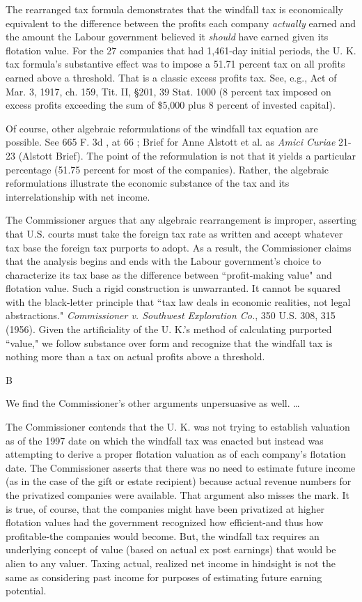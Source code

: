 \begin{select}
The rearranged tax formula demonstrates that the windfall tax is economically equivalent to the difference between the profits each company \emph{actually} earned and the amount the Labour government believed it \emph{should} have earned given its flotation value. For the 27 companies that had 1,461-day initial periods, the U. K. tax formula's substantive effect was to impose a 51.71 percent tax on all profits earned above a threshold. That is a classic excess profits tax. See, e.g., Act of Mar. 3, 1917, ch. 159, Tit. II, §201, 39 Stat. 1000 (8 percent tax imposed on excess profits exceeding the sum of \$5,000 plus 8 percent of invested capital).

Of course, other algebraic reformulations of the windfall tax equation are possible. See 665 F. 3d , at 66 ; Brief for Anne Alstott et al. as \emph{Amici Curiae} 21-23 (Alstott Brief). The point of the reformulation is not that it yields a particular percentage (51.75 percent for most of the companies). Rather, the algebraic reformulations illustrate the economic substance of the tax and its interrelationship with net income. 

The Commissioner argues that any algebraic rearrangement is improper, asserting that U.S. courts must take the foreign tax rate as written and accept whatever tax base the foreign tax purports to adopt.  As a result, the Commissioner claims that the analysis begins and ends with the Labour government's choice to characterize its tax base as the difference between ``profit-making value" and flotation value. Such a rigid construction is unwarranted. It cannot be squared with the black-letter principle that ``tax law deals in economic realities, not legal abstractions." \emph{Commissioner v. Southwest Exploration Co.}, 350 U.S. 308, 315 (1956). Given the artificiality of the  U. K.'s method of calculating purported ``value," we follow substance over form and recognize that the windfall tax is nothing more than a tax on actual profits above a threshold. 

\begin{center}
B
\end{center}

We find the Commissioner's other arguments unpersuasive as well. \ldots 

The Commissioner contends that the U. K. was not trying to establish valuation as of the 1997 date on which the windfall tax was enacted but instead was attempting to derive a proper flotation valuation as of each company's flotation date.  The Commissioner asserts that there was no need to estimate future income (as in the case of the gift or estate recipient) because actual revenue numbers for the privatized companies were available.  That argument also misses the mark. It is true, of course, that the companies might have been privatized at higher flotation values had the government recognized how efficient-and thus how profitable-the companies would become. But, the windfall tax requires an underlying concept of value (based on actual ex post earnings) that would be alien to any valuer. Taxing actual, realized net income in hindsight is not the same as considering past income for purposes of estimating future earning potential.


\end{select}
